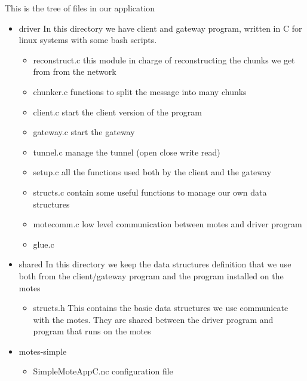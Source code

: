 \documentclass[11pt]{article}
\begin{document}
  This is the tree of files in our application
\begin{itemize}
\item driver
    In this directory we have client and gateway program, written in C for linux systems with some bash scripts.

\begin{itemize}
\item reconstruct.c
      this module in charge of reconstructing the chunks we get from from the network
\item chunker.c
      functions to split the message into many chunks
\item client.c
      start the client version of the program
\item gateway.c
      start the gateway
\item tunnel.c
      manage the tunnel (open close write read)
\item setup.c
      all the functions used both by the client and the gateway
\item structs.c
      contain some useful functions to manage our own data structures
\item motecomm.c
      low level communication between motes and driver program
\item glue.c
\end{itemize}

\item shared
    In this directory we keep the data structures definition that we use both from the client/gateway program and the program installed on the motes

\begin{itemize}
\item structs.h
      This contains the basic data structures we use communicate with the motes.
      They are shared between the driver program and program that runs on the motes
\end{itemize}

\item motes-simple

\begin{itemize}
\item SimpleMoteAppC.nc
      configuration file
\end{itemize}

\end{itemize}
\end{document}
